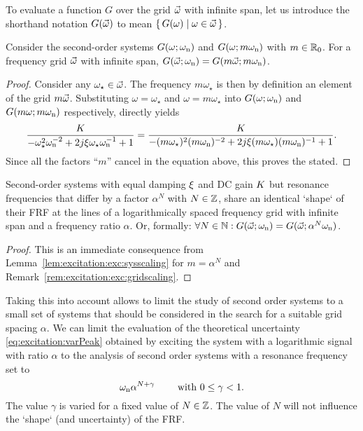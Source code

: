   \begin{definition}
  To evaluate a function $G$ over the grid $\vec{\omega}$ with infinite span, let us introduce the shorthand notation $G(\vec{\omega})$ to mean $\set{G(\omega) | \omega \in \ensuremath{\vec{\omega}}}$.
  \end{definition}

  \begin{lemma} \label{lem:excitation:exc:sysscaling}
  Consider the second-order systems $G(\omega; \omega_{\mathrm{n}})$ and $G(\omega; m\omega_{\mathrm{n}})$ with $m \in {\ensuremath{\mathbb{R}}}_{0}$. 
  For a frequency grid $\vec{\omega}$ with infinite span, $G(\vec{\omega}; \omega_{\mathrm{n}}) = G(m \vec{\omega}; m\omega_{\mathrm{n}})$.
  \end{lemma}
  \begin{proof}
  Consider any $\omega_{\star} \in \vec{\omega}$. The frequency $m\omega_{\star}$ is then by definition an element of the grid $m\vec{\omega}$.
  Substituting $\omega = \omega_{\star}$ and $\omega = m \omega_{\star}$  into  $G(\omega; \omega_{\mathrm{n}})$ and $G(m\omega; m\omega_{\mathrm{n}})$  respectively, directly yields
  \begin{equation}
    \frac{K_{}}{- \omega_{\star}^2 \omega_{\mathrm{n}}^{-2} + 2j\xi_{} \omega_{\star} \omega_{\mathrm{n}}^{-1} + 1} = 
    \frac{K_{}}{- (m\omega_{\star})^2 (m\omega_{\mathrm{n}})^{-2} + 2j\xi_{} (m\omega_{\star}) (m\omega_{\mathrm{n}})^{-1} + 1}
    \text{.}
  \end{equation}
  Since all the factors ``$m$'' cancel in the equation above, this proves the stated.
  \end{proof}

  \begin{theorem}
    Second-order  systems with equal damping $\xi_{}$ and \gls{DC} gain $K_{}$ but resonance frequencies that differ by a factor $\alpha^N$ with $N \in \mathbb{Z}$, share an identical `shape` of their \gls{FRF} at the lines of a logarithmically spaced frequency grid with infinite span and a frequency ratio $\alpha$.
    Or, formally: $\forall N \in \mathbb{N}: G(\vec{\omega};\omega_{\mathrm{n}}) = G(\vec{\omega}; \alpha^{N}\omega_{\mathrm{n}})$.
  \end{theorem}
  \begin{proof}
    This is an immediate consequence from Lemma~\ref{lem:excitation:exc:sysscaling} for $m= \alpha^{N}$ and Remark~\ref{rem:excitation:exc:gridscaling}.
  \end{proof}

  Taking this into account allows to limit the study of second order systems to a small set of systems that should be considered in the search for a suitable grid spacing $\alpha$.
  We can limit the evaluation of the theoretical uncertainty \eqref{eq:excitation:varPeak} obtained by exciting the system with a logarithmic signal with ratio $\alpha$ to the analysis of second order systems with a resonance frequency set to
  \begin{equation}
    \omega_{\mathrm{n}} \alpha^{N+\gamma}\qquad \text{ with } 0 \leq \gamma < 1\text{.}
    \label{eq:excitation:theoreticalBestVariationOmega}
  \end{equation}
  The value $\gamma$ is varied for a fixed value of $N \in \mathbb{Z}$.
  The value of $N$ will not influence the `shape` (and uncertainty) of the \gls{FRF}.

